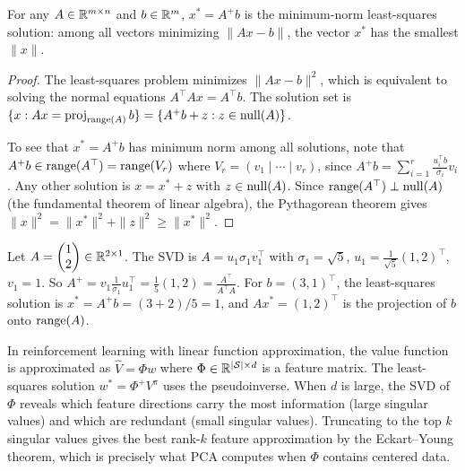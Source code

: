 \documentclass[11pt,a4paper]{article}
\begin{document}
\begin{theorem}
\label{thm:pseudo_ls}
For any $A \in \mathbb{R}^{m \times n}$ and $b \in \mathbb{R}^m$, $x^* = A^+ b$ is
the minimum-norm least-squares solution: among all vectors minimizing
$\|Ax - b\|$, the vector $x^*$ has the smallest $\|x\|$.
\end{theorem}

\begin{proof}
The least-squares problem minimizes $\|Ax - b\|^2$, which is equivalent
to solving the normal equations $A^\top A x = A^\top b$.  The solution
set is $\{x : Ax = \operatorname{proj}_{\operatorname{range}(A)} b\} = \{A^+ b + z : z \in \operatorname{null}(A)\}$.

To see that $x^* = A^+ b$ has minimum norm among all solutions,
note that $A^+ b \in \operatorname{range}(A^\top) = \operatorname{range}(V_r)$ where
$V_r = (v_1 \mid \cdots \mid v_r)$, since
$A^+ b = \sum_{i=1}^r \frac{u_i^\top b}{\sigma_i} v_i$.
Any other solution is $x = x^* + z$ with $z \in \operatorname{null}(A)$.
Since $\operatorname{range}(A^\top) \perp \operatorname{null}(A)$
(the fundamental theorem of linear algebra), the Pythagorean theorem
gives $\|x\|^2 = \|x^*\|^2 + \|z\|^2 \geq \|x^*\|^2$.
\end{proof}

\begin{example}
\label{ex:pseudo_rank1}
Let $A = \begin{pmatrix} 1 \\ 2 \end{pmatrix} \in \mathbb{R}^{2 \times 1}$.
The SVD is $A = u_1 \sigma_1 v_1^\top$ with $\sigma_1 = \sqrt{5}$,
$u_1 = \frac{1}{\sqrt{5}}(1,2)^\top$, $v_1 = 1$.  So
$A^+ = v_1 \frac{1}{\sigma_1} u_1^\top = \frac{1}{5}(1, 2)
= \frac{A^\top}{A^\top A}$.  For $b = (3, 1)^\top$, the least-squares
solution is $x^* = A^+ b = (3 + 2)/5 = 1$, and
$Ax^* = (1, 2)^\top$ is the projection of $b$ onto $\operatorname{range}(A)$.
\end{example}

\begin{rlconnection}[title={SVD in Dimensionality Reduction and Linear Function Approximation}]
In reinforcement learning with linear function approximation,
the value function is approximated as $\hat{V} = \Phi w$ where
$\Phi \in \mathbb{R}^{|\mathcal{S}| \times d}$ is a feature matrix.
The least-squares solution $w^* = \Phi^+ V^\pi$ uses the
pseudoinverse.  When $d$ is large, the SVD of $\Phi$ reveals which
feature directions carry the most information (large singular values)
and which are redundant (small singular values).  Truncating to the
top $k$ singular values gives the best rank-$k$ feature approximation
by the Eckart--Young theorem, which is precisely what PCA computes
when $\Phi$ contains centered data.
\end{rlconnection}
\end{document}
